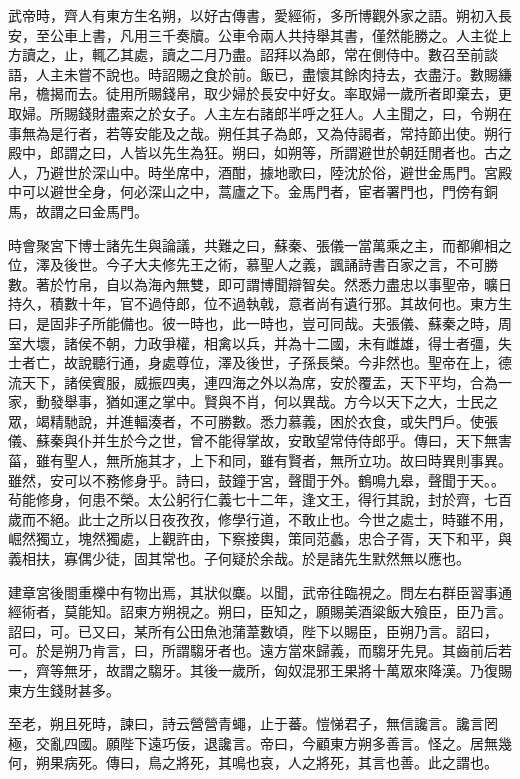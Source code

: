 武帝時，齊人有東方生名朔，以好古傳書，愛經術，多所博觀外家之語。朔初入長安，至公車上書，凡用三千奏牘。公車令兩人共持舉其書，僅然能勝之。人主從上方讀之，止，輒乙其處，讀之二月乃盡。詔拜以為郎，常在側侍中。數召至前談語，人主未嘗不說也。時詔賜之食於前。飯已，盡懷其餘肉持去，衣盡汙。數賜縑帛，檐揭而去。徒用所賜錢帛，取少婦於長安中好女。率取婦一歲所者即棄去，更取婦。所賜錢財盡索之於女子。人主左右諸郎半呼之狂人。人主聞之，曰，令朔在事無為是行者，若等安能及之哉。朔任其子為郎，又為侍謁者，常持節出使。朔行殿中，郎謂之曰，人皆以先生為狂。朔曰，如朔等，所謂避世於朝廷閒者也。古之人，乃避世於深山中。時坐席中，酒酣，據地歌曰，陸沈於俗，避世金馬門。宮殿中可以避世全身，何必深山之中，蒿廬之下。金馬門者，宦者署門也，門傍有銅馬，故謂之曰金馬門。

時會聚宮下博士諸先生與論議，共難之曰，蘇秦、張儀一當萬乘之主，而都卿相之位，澤及後世。今子大夫修先王之術，慕聖人之義，諷誦詩書百家之言，不可勝數。著於竹帛，自以為海內無雙，即可謂博聞辯智矣。然悉力盡忠以事聖帝，曠日持久，積數十年，官不過侍郎，位不過執戟，意者尚有遺行邪。其故何也。東方生曰，是固非子所能備也。彼一時也，此一時也，豈可同哉。夫張儀、蘇秦之時，周室大壞，諸侯不朝，力政爭權，相禽以兵，并為十二國，未有雌雄，得士者彊，失士者亡，故說聽行通，身處尊位，澤及後世，子孫長榮。今非然也。聖帝在上，德流天下，諸侯賓服，威振四夷，連四海之外以為席，安於覆盂，天下平均，合為一家，動發舉事，猶如運之掌中。賢與不肖，何以異哉。方今以天下之大，士民之眾，竭精馳說，并進輻湊者，不可勝數。悉力慕義，困於衣食，或失門戶。使張儀、蘇秦與仆并生於今之世，曾不能得掌故，安敢望常侍侍郎乎。傳曰，天下無害菑，雖有聖人，無所施其才，上下和同，雖有賢者，無所立功。故曰時異則事異。雖然，安可以不務修身乎。詩曰，鼓鐘于宮，聲聞于外。鶴鳴九皋，聲聞于天。。茍能修身，何患不榮。太公躬行仁義七十二年，逢文王，得行其說，封於齊，七百歲而不絕。此士之所以日夜孜孜，修學行道，不敢止也。今世之處士，時雖不用，崛然獨立，塊然獨處，上觀許由，下察接輿，策同范蠡，忠合子胥，天下和平，與義相扶，寡偶少徒，固其常也。子何疑於余哉。於是諸先生默然無以應也。

建章宮後閤重櫟中有物出焉，其狀似麋。以聞，武帝往臨視之。問左右群臣習事通經術者，莫能知。詔東方朔視之。朔曰，臣知之，願賜美酒粱飯大飱臣，臣乃言。詔曰，可。已又曰，某所有公田魚池蒲葦數頃，陛下以賜臣，臣朔乃言。詔曰，可。於是朔乃肯言，曰，所謂騶牙者也。遠方當來歸義，而騶牙先見。其齒前后若一，齊等無牙，故謂之騶牙。其後一歲所，匈奴混邪王果將十萬眾來降漢。乃復賜東方生錢財甚多。

至老，朔且死時，諫曰，詩云營營青蠅，止于蕃。愷悌君子，無信讒言。讒言罔極，交亂四國。願陛下遠巧佞，退讒言。帝曰，今顧東方朔多善言。怪之。居無幾何，朔果病死。傳曰，鳥之將死，其鳴也哀，人之將死，其言也善。此之謂也。

